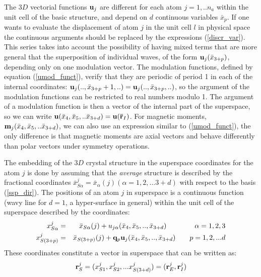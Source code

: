 \documentclass[10pt]{article}
\begin{document}
The $3D$ vectorial functions ${\bf u}_j$ are different for each atom $j=1,..n_a$ within the unit cell of the basic structure, and depend on $d$ continuous variables ${\bar x}_p$. If one wants to evaluate the displacement of atom $j$ in the unit cell $l$ in physical space the continuous arguments should be replaced by the expressions (\ref{discr_var}). 
This series takes into account the possibility of having mixed terms that are more general that the superposition of individual waves, of the form ${\bf u}_j(\bar{x}_{3+p})$,  depending only on one modulation vector. The modulation functions, defined by equation (\ref{umod_funct}), verify that they are periodic of period 1 in each of the internal coordinates: ${\bf u}_j(..,\bar{x}_{3+p}+1,..)={\bf u}_j(..,\bar{x}_{3+p},..)$, so the argument of the modulation functions can be restricted to real numbers modulo 1. 
The argument of a modulation function is then a vector of the internal part of the superspace, so we can write ${\bf u}(\bar{x}_4,\bar{x}_5,..\bar{x}_{3+d}) ={\bf u}({\bf \bar r}_I) $.
For magnetic moments, ${\bf m}_j (\bar{x}_4,\bar{x}_5,..\bar{x}_{3+d})$, we can also use an expression similar to (\ref{umod_funct}), the only difference is that magnetic moments are axial vectors and behave differently than polar vectors under symmetry operations.

The embedding of the $3D$ crystal structure in the superspace coordinates for the atom $j$ is done by assuming that the {\it average} structure is described by the fractional coordinates ${\bar x}_{S\alpha}^j = {\bar x}_{\alpha}(j)(\alpha=1,2,...3+d)$  with respect to the basis (\ref{ssp_dir}).  
The positions of an atom $j$ in superspace is a continuous function \cite{deWolff1} (wavy line for $d=1$, a hyper-surface in general) within the unit cell of the superspace described by the coordinates:
\begin{eqnarray} 
x_{S\alpha}^j &=& \bar x_{S\alpha}(j) + u_{j\alpha}( \bar{x}_4,\bar{x}_5,..,\bar{x}_{3+d}) \qquad \qquad \alpha=1,2,3\\
x_{S(3+p)}^j&=& \bar x_{S(3+p)}(j) + {\bf q}_p{\bf u}_{j}(\bar{x}_4,\bar{x}_5,..,\bar{x}_{3+d}) \qquad p=1,2,...d 
\end{eqnarray}
These coordinates constitute a vector in superspace that can be written as:
\begin{equation} 
{\bf r}_S^j = (x_{S1}^j, x_{S2}^j, ... x_{S(3+d)}^j) =({\bf r}_E^j, {\bf r}_I^j)\\
\end{equation}
\end{document}
